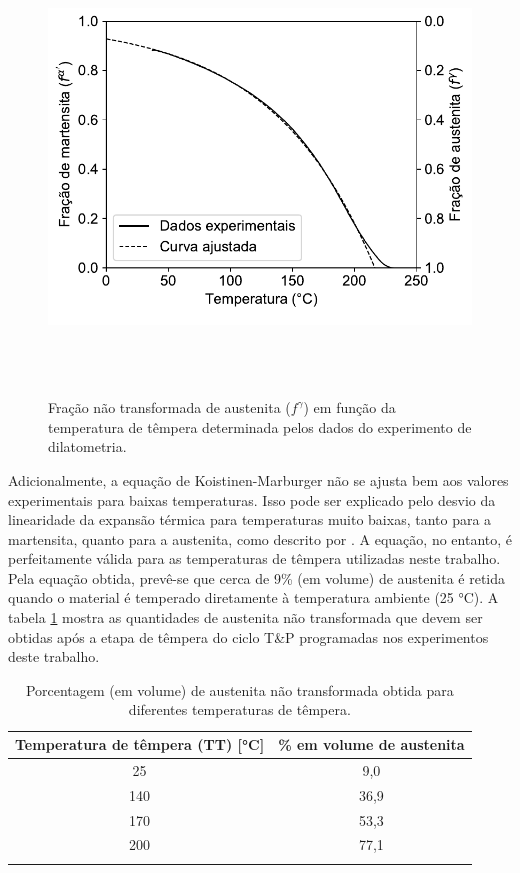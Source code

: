 \begin{figure}
	\includegraphics[height=12cm]{img/dilatometria/frac_martensita.pdf}
	\caption{Fração não transformada de austenita ($f^\gamma$) em função da temperatura de têmpera determinada pelos dados do experimento de dilatometria.}
	\label{fig:KMFoFo}
\end{figure}

Adicionalmente, a equação de Koistinen-Marburger não se ajusta bem aos valores experimentais para baixas temperaturas. Isso pode ser explicado pelo desvio da linearidade da expansão térmica para temperaturas muito baixas, tanto para a martensita, quanto para a austenita, como descrito por . A equação, no entanto, é perfeitamente válida para as temperaturas de têmpera utilizadas neste trabalho. Pela equação obtida, prevê-se que cerca de 9\% (em volume) de austenita é retida quando o material é temperado diretamente à temperatura ambiente (25 °C). A tabela \ref{tab:austRetida} mostra as quantidades de austenita não transformada que devem ser obtidas após a etapa de têmpera do ciclo T\&P programadas nos experimentos deste trabalho.

\begin{table}
	\caption{Porcentagem (em volume) de austenita não transformada obtida para diferentes temperaturas de têmpera.}
	\begin{tabular}{c c}
	\thickhline
	Temperatura de têmpera (TT) [°C] & \% em volume de austenita\\
	\hline
	25 &  9,0\\
	140 & 36,9\\ 
	170 & 53,3\\
	200 & 77,1\\
	\thickhline
	\end{tabular}
	\label{tab:austRetida}
\end{table}

